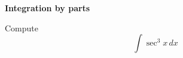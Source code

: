 \documentclass[11pt]{report}
\theoremstyle{theorem}
\theoremstyle{definition}
\theoremstyle{indented}
\numberwithin{equation}{section}
\begin{document}
\begin{center}
\textbf{Integration by parts}
\end{center}

Compute
\[
	\int \sec^3 x \,dx
\]

\begin{solution}
{

}
\end{solution}
\end{document}
